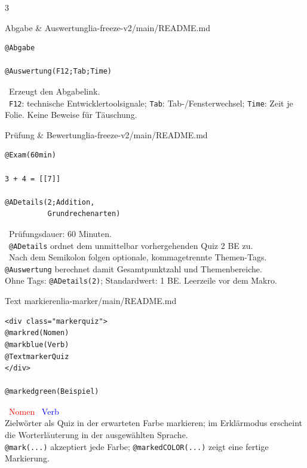 \documentclass[a4paper,landscape,9pt]{extarticle}
\newcommand{\prevsm}[1]{{\footnotesize\color{muted} #1}}
\begin{document}
\begin{multicols}{3}

\begin{schulcard}{Abgabe \& Auswertung}{lia-freeze-v2/main/README.md}
\begin{lstlisting}[language=lia]
@Abgabe

@Auswertung(F12;Tab;Time)
\end{lstlisting}
\tcblower
\prevsm{\faShareSquare~Erzeugt den Abgabelink.\\[2pt]
\faChartBar~\texttt{F12}: technische Entwicklertoolsignale; \texttt{Tab}: Tab-/Fensterwechsel; \texttt{Time}: Zeit je Folie. Keine Beweise für Täuschung.}
\end{schulcard}

\begin{schulcard}{Prüfung \& Bewertung}{lia-freeze-v2/main/README.md}
\begin{lstlisting}[language=lia]
@Exam(60min)

3 + 4 = [[7]]

@ADetails(2;Addition,
          Grundrechenarten)
\end{lstlisting}
\tcblower
\prevsm{\faClock~Prüfungsdauer: 60 Minuten.\\[2pt]
\faTasks~\texttt{@ADetails} ordnet dem unmittelbar vorhergehenden Quiz 2 BE zu.\\[2pt]
\faTags~Nach dem Semikolon folgen optionale, kommagetrennte Themen-Tags. \texttt{@Auswertung} berechnet damit Gesamtpunktzahl und Themenbereiche.\\[2pt]
{\footnotesize Ohne Tags: \texttt{@ADetails(2)}; Standardwert: 1 BE. Leerzeile vor dem Makro.}}
\end{schulcard}

\begin{schulcard}{Text markieren}{lia-marker/main/README.md}
\begin{lstlisting}[language=lia]
<div class="markerquiz">
@markred(Nomen)
@markblue(Verb)
@TextmarkerQuiz
</div>

@markedgreen(Beispiel)
\end{lstlisting}
\tcblower
\prevsm{\textcolor{red}{\faHighlighter~Nomen}\quad
\textcolor{blue}{\faHighlighter~Verb}\\[3pt]
Zielwörter als Quiz in der erwarteten Farbe markieren; im Erklärmodus erscheint die Worterläuterung in der ausgewählten Sprache.\\[2pt]
{\footnotesize \texttt{@mark(...)} akzeptiert jede Farbe; \texttt{@markedCOLOR(...)} zeigt eine fertige Markierung.}}
\end{schulcard}


\end{multicols}
\end{document}
